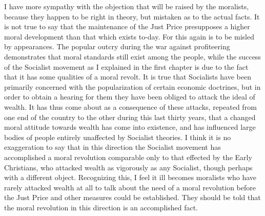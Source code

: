 \documentclass{book}
\begin{document}
I have more sympathy with the objection that will be raised by the moralists, because they happen to be right in theory, but mistaken as to the actual facts. It is not true to say that the maintenance of the Just Price presupposes a higher moral development than that which exists to-day. For this again is to be misled by appearances. The popular outcry during the war against profiteering demonstrates that moral standards still exist among the people, while the success of the Socialist movement as I explained in the first chapter is due to the fact that it has some qualities of a moral revolt. It is true that Socialists have been primarily concerned with the popularization of certain economic doctrines, but in order to obtain a hearing for them they have been obliged to attack the ideal of wealth. It has thus come about as a consequence of these attacks, repeated from one end of the country to the other during this last thirty years, that a changed moral attitude towards wealth has come into existence, and has influenced large bodies of people entirely unaffected by Socialist theories. I think it is no exaggeration to say that in this direction the Socialist movement has accomplished a moral revolution comparable only to that effected by the Early Christians, who attacked wealth as vigorously as any Socialist, though perhaps with a different object. Recognizing this, I feel it ill becomes moralists who have rarely attacked wealth at all to talk about the need of a moral revolution before the Just Price and other measures could be established. They should be told that the moral revolution in this direction is an accomplished fact.
\end{document}
